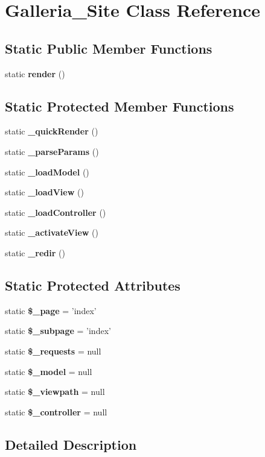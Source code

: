 \section{Galleria\_\-Site Class Reference}
\label{classGalleria__Site}
\subsection*{Static Public Member Functions}
\begin{CompactItemize}
\item 
static {\bf render} ()
\end{CompactItemize}
\subsection*{Static Protected Member Functions}
\begin{CompactItemize}
\item 
static {\bf \_\-quickRender} ()
\item 
static {\bf \_\-parseParams} ()
\item 
static {\bf \_\-loadModel} ()
\item 
static {\bf \_\-loadView} ()
\item 
static {\bf \_\-loadController} ()
\item 
static {\bf \_\-activateView} ()
\item 
static {\bf \_\-redir} ()
\end{CompactItemize}
\subsection*{Static Protected Attributes}
\begin{CompactItemize}
\item 
static {\bf \$\_\-page} = 'index'
\item 
static {\bf \$\_\-subpage} = 'index'
\item 
static {\bf \$\_\-requests} = null
\item 
static {\bf \$\_\-model} = null
\item 
static {\bf \$\_\-viewpath} = null
\item 
static {\bf \$\_\-controller} = null
\end{CompactItemize}


\subsection{Detailed Description}


